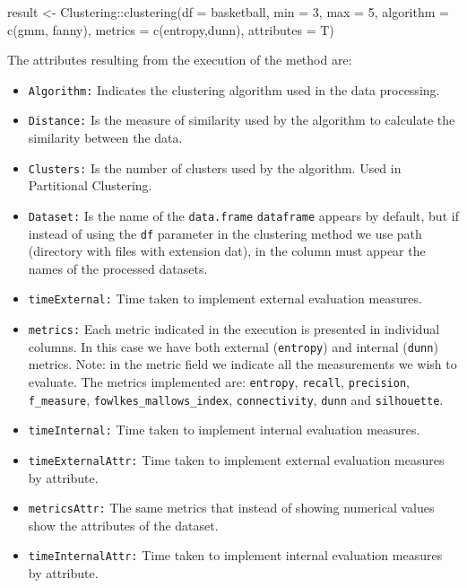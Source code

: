 \documentclass[
]{article}
\newenvironment{Shaded}{\begin{snugshade}}{\end{snugshade}}
\newcommand{\AttributeTok}[1]{\textcolor[rgb]{0.77,0.63,0.00}{#1}}
\newcommand{\DecValTok}[1]{\textcolor[rgb]{0.00,0.00,0.81}{#1}}
\newcommand{\FunctionTok}[1]{\textcolor[rgb]{0.00,0.00,0.00}{#1}}
\newcommand{\NormalTok}[1]{#1}
\newcommand{\OtherTok}[1]{\textcolor[rgb]{0.56,0.35,0.01}{#1}}
\newcommand{\SpecialCharTok}[1]{\textcolor[rgb]{0.00,0.00,0.00}{#1}}
\newcommand{\StringTok}[1]{\textcolor[rgb]{0.31,0.60,0.02}{#1}}
\providecommand{\tightlist}{%
  \setlength{\itemsep}{0pt}\setlength{\parskip}{0pt}}
\begin{document}
\begin{Shaded}
\begin{Highlighting}[]
\NormalTok{result }\OtherTok{\textless{}{-}}\NormalTok{ Clustering}\SpecialCharTok{::}\FunctionTok{clustering}\NormalTok{(}\AttributeTok{df =}\NormalTok{ basketball, }\AttributeTok{min =} \DecValTok{3}\NormalTok{, }\AttributeTok{max =} \DecValTok{5}\NormalTok{, }\AttributeTok{algorithm =} \FunctionTok{c}\NormalTok{(}\StringTok{\textquotesingle{}gmm\textquotesingle{}}\NormalTok{,}
                        \StringTok{\textquotesingle{}fanny\textquotesingle{}}\NormalTok{), }\AttributeTok{metrics =} \FunctionTok{c}\NormalTok{(}\StringTok{\textquotesingle{}entropy\textquotesingle{}}\NormalTok{,}\StringTok{\textquotesingle{}dunn\textquotesingle{}}\NormalTok{), }\AttributeTok{attributes =}\NormalTok{ T)}
\end{Highlighting}
\end{Shaded}

The attributes resulting from the execution of the method are:

\begin{itemize}
\tightlist
\item
  \texttt{Algorithm:} Indicates the clustering algorithm used in the
  data processing.

  \item

  \texttt{Distance:} Is the measure of similarity used by the algorithm
  to calculate the similarity between the data.
\item
  \texttt{Clusters:} Is the number of clusters used by the algorithm.
  Used in Partitional Clustering.
\item
  \texttt{Dataset:} Is the name of the \texttt{data.frame}
  \texttt{dataframe} appears by default, but if instead of using the
  \texttt{df} parameter in the clustering method we use path (directory
  with files with extension dat), in the column must appear the names of
  the processed datasets.
\item
  \texttt{timeExternal:} Time taken to implement external evaluation
  measures.
\item
  \texttt{metrics:} Each metric indicated in the execution is presented
  in individual columns. In this case we have both external
  (\texttt{entropy}) and internal (\texttt{dunn}) metrics. Note: in the
  metric field we indicate all the measurements we wish to evaluate. The
  metrics implemented are: \texttt{entropy}, \texttt{recall},
  \texttt{precision}, \texttt{f\_measure},
  \texttt{fowlkes\_mallows\_index}, \texttt{connectivity}, \texttt{dunn}
  and \texttt{silhouette}.
\item
  \texttt{timeInternal:} Time taken to implement internal evaluation
  measures.
\item
  \texttt{timeExternalAttr:} Time taken to implement external evaluation
  measures by attribute.
\item
  \texttt{metricsAttr:} The same metrics that instead of showing
  numerical values show the attributes of the dataset.
\item
  \texttt{timeInternalAttr:} Time taken to implement internal evaluation
  measures by attribute.
\end{itemize}
\end{document}

